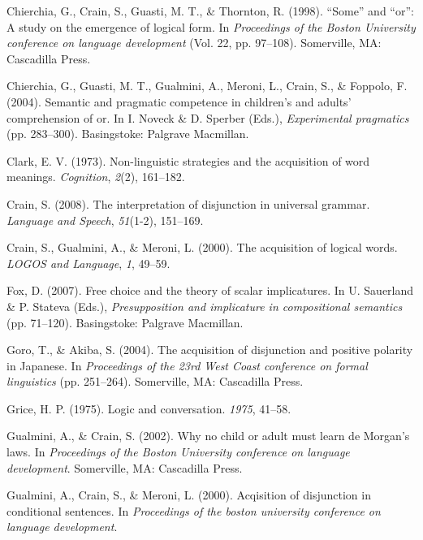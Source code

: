 \documentclass[,man,floatsintext]{apa6}
\begin{document}
\leavevmode\hypertarget{ref-chierchia1998some}{}%
Chierchia, G., Crain, S., Guasti, M. T., \& Thornton, R. (1998). ``Some'' and ``or'': A study on the emergence of logical form. In \emph{Proceedings of the Boston University conference on language development} (Vol. 22, pp. 97--108). Somerville, MA: Cascadilla Press.

\leavevmode\hypertarget{ref-chierchia2004semantic}{}%
Chierchia, G., Guasti, M. T., Gualmini, A., Meroni, L., Crain, S., \& Foppolo, F. (2004). Semantic and pragmatic competence in children's and adults' comprehension of or. In I. Noveck \& D. Sperber (Eds.), \emph{Experimental pragmatics} (pp. 283--300). Basingstoke: Palgrave Macmillan.

\leavevmode\hypertarget{ref-clark1973non}{}%
Clark, E. V. (1973). Non-linguistic strategies and the acquisition of word meanings. \emph{Cognition}, \emph{2}(2), 161--182.

\leavevmode\hypertarget{ref-crain2008interpretation}{}%
Crain, S. (2008). The interpretation of disjunction in universal grammar. \emph{Language and Speech}, \emph{51}(1-2), 151--169.

\leavevmode\hypertarget{ref-crain2000acquisition}{}%
Crain, S., Gualmini, A., \& Meroni, L. (2000). The acquisition of logical words. \emph{LOGOS and Language}, \emph{1}, 49--59.

\leavevmode\hypertarget{ref-fox2007free}{}%
Fox, D. (2007). Free choice and the theory of scalar implicatures. In U. Sauerland \& P. Stateva (Eds.), \emph{Presupposition and implicature in compositional semantics} (pp. 71--120). Basingstoke: Palgrave Macmillan.

\leavevmode\hypertarget{ref-goro2004acquisition}{}%
Goro, T., \& Akiba, S. (2004). The acquisition of disjunction and positive polarity in Japanese. In \emph{Proceedings of the 23rd West Coast conference on formal linguistics} (pp. 251--264). Somerville, MA: Cascadilla Press.

\leavevmode\hypertarget{ref-grice1975logic}{}%
Grice, H. P. (1975). Logic and conversation. \emph{1975}, 41--58.

\leavevmode\hypertarget{ref-gualminicrain2002}{}%
Gualmini, A., \& Crain, S. (2002). Why no child or adult must learn de Morgan's laws. In \emph{Proceedings of the Boston University conference on language development}. Somerville, MA: Cascadilla Press.

\leavevmode\hypertarget{ref-gualmini2000}{}%
Gualmini, A., Crain, S., \& Meroni, L. (2000). Acqisition of disjunction in conditional sentences. In \emph{Proceedings of the boston university conference on language development}.
\end{document}
